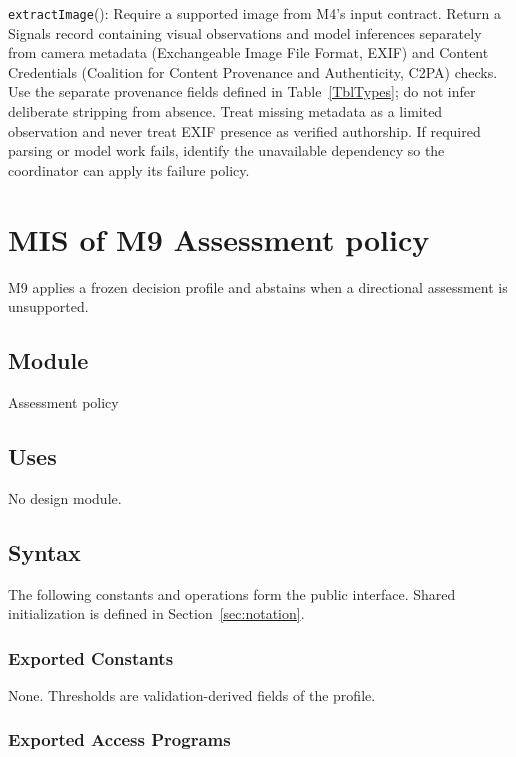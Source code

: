 \documentclass[12pt, titlepage]{article}
\begin{document}
\noindent \texttt{extractImage}():
Require a supported image from M4's input contract. Return a Signals record containing visual observations and model inferences separately from camera metadata (Exchangeable Image File Format, EXIF) and Content Credentials (Coalition for Content Provenance and Authenticity, C2PA) checks. Use the separate provenance fields defined in Table~\ref{TblTypes}; do not infer deliberate stripping from absence. Treat missing metadata as a limited observation and never treat EXIF presence as verified authorship. If required parsing or model work fails, identify the unavailable dependency so the coordinator can apply its failure policy.

\clearpage
\section{MIS of M9 Assessment policy} \label{sec:m9}

M9 applies a frozen decision profile and abstains when a directional assessment is unsupported.

\subsection{Module}

Assessment policy

\subsection{Uses}

No design module.

\subsection{Syntax}

The following constants and operations form the public interface. Shared initialization is defined in Section~\ref{sec:notation}.

\subsubsection{Exported Constants}

None. Thresholds are validation-derived fields of the profile.

\subsubsection{Exported Access Programs}
\end{document}
